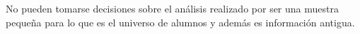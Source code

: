 No pueden tomarse decisiones sobre el análisis realizado por ser una muestra pequeña para lo que es el universo de alumnos y además es información antigua.